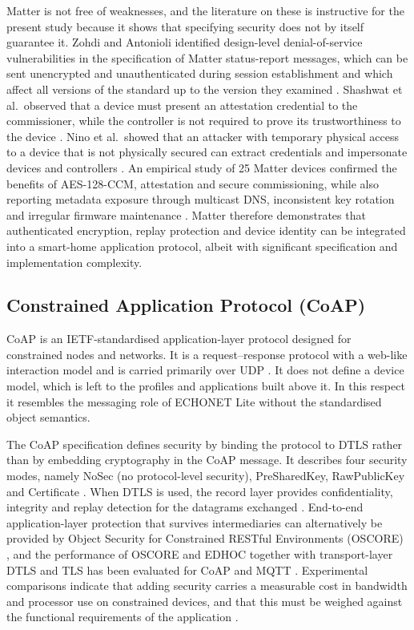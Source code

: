 Matter is not free of weaknesses, and the literature on these is instructive for the present study because it shows that specifying security does not by itself guarantee it. Zohdi and Antonioli identified design-level denial-of-service vulnerabilities in the specification of Matter status-report messages, which can be sent unencrypted and unauthenticated during session establishment and which affect all versions of the standard up to the version they examined \cite{Zohdi2026}. Shashwat et al.\ observed that a device must present an attestation credential to the commissioner, while the controller is not required to prove its trustworthiness to the device \cite{Shashwat2023}. Nino et al.\ showed that an attacker with temporary physical access to a device that is not physically secured can extract credentials and impersonate devices and controllers \cite{Nino2026}. An empirical study of 25 Matter devices confirmed the benefits of AES-128-CCM, attestation and secure commissioning, while also reporting metadata exposure through multicast DNS, inconsistent key rotation and irregular firmware maintenance \cite{Losty2026}. Matter therefore demonstrates that authenticated encryption, replay protection and device identity can be integrated into a smart-home application protocol, albeit with significant specification and implementation complexity.

\subsection{Constrained Application Protocol (CoAP)}
\label{sec:coap}

CoAP is an IETF-standardised application-layer protocol designed for constrained nodes and networks. It is a request--response protocol with a web-like interaction model and is carried primarily over UDP \cite{RFC7252}. It does not define a device model, which is left to the profiles and applications built above it. In this respect it resembles the messaging role of ECHONET Lite without the standardised object semantics.

The CoAP specification defines security by binding the protocol to DTLS rather than by embedding cryptography in the CoAP message. It describes four security modes, namely NoSec (no protocol-level security), PreSharedKey, RawPublicKey and Certificate \cite{RFC7252}. When DTLS is used, the record layer provides confidentiality, integrity and replay detection for the datagrams exchanged \cite{RFC6347,RFC9147}. End-to-end application-layer protection that survives intermediaries can alternatively be provided by Object Security for Constrained RESTful Environments (OSCORE) \cite{RFC8613}, and the performance of OSCORE and EDHOC together with transport-layer DTLS and TLS has been evaluated for CoAP and MQTT \cite{Laaroussi2021}. Experimental comparisons indicate that adding security carries a measurable cost in bandwidth and processor use on constrained devices, and that this must be weighed against the functional requirements of the application \cite{Seoane2021,Laaroussi2021}.

